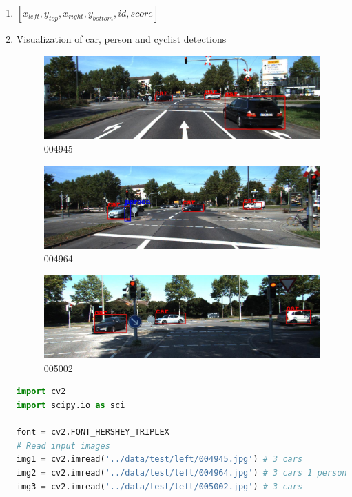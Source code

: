 \documentclass{csc_assignment4}
\begin{document}
\begin{description}
\begin{enumerate}[label=(\alph*)]
\clearpage
\item $[x_{left}, y_{top}, x_{right}, y_{bottom}, id, score]$
\item Visualization of car, person and cyclist detections
\begin{figure}[h!]
\includegraphics[width=1.0\textwidth, center]{code/004945.jpg}
\vspace*{-5mm}
\caption{004945}
\end{figure}
\begin{figure}[h!]
\includegraphics[width=1.0\textwidth, center]{code/004964.jpg}
\vspace*{-5mm}
\caption{004964}
\end{figure}
\begin{figure}[h!]
\includegraphics[width=1.0\textwidth, center]{code/005002.jpg}
\vspace*{-5mm}
\caption{005002}
\end{figure}

\newpage
\begin{lstlisting}[language=Python]
import cv2
import scipy.io as sci

font = cv2.FONT_HERSHEY_TRIPLEX
# Read input images
img1 = cv2.imread('../data/test/left/004945.jpg') # 3 cars
img2 = cv2.imread('../data/test/left/004964.jpg') # 3 cars 1 person
img3 = cv2.imread('../data/test/left/005002.jpg') # 3 cars


\end{lstlisting}
\end{enumerate}
\end{description}
\end{document}
